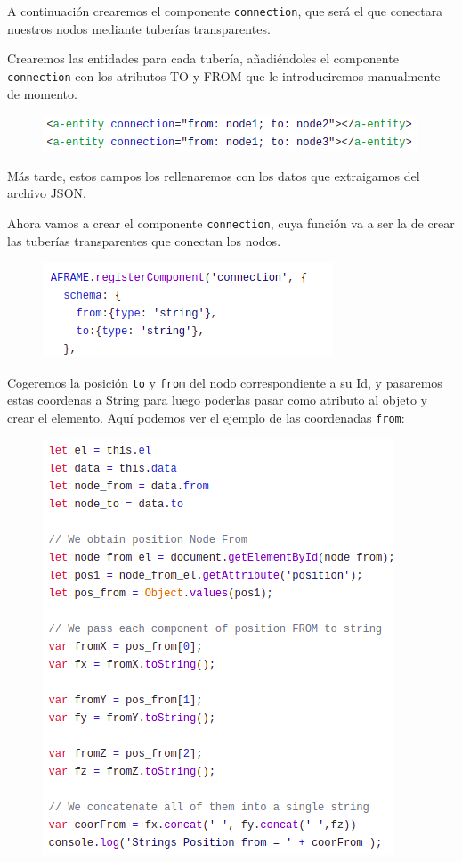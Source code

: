 \documentclass[a4paper, 12pt]{book}
\begin{document}
A continuación crearemos el componente \texttt{connection}, que será el que conectara nuestros nodos mediante tuberías transparentes.

Crearemos las entidades para cada tubería, añadiéndoles el componente \texttt{connection} con los atributos TO y FROM que le introduciremos manualmente de momento.

\begin{figure}[h]
\centering
    \includegraphics[scale=0.7]{img/entidad_connect.png}
\end{figure}

Más tarde, estos campos los rellenaremos con los datos que extraigamos del archivo JSON.

Ahora vamos a crear el componente \texttt{connection}, cuya función va a ser la de crear las tuberías transparentes que conectan los nodos.

\begin{figure}[h]
\centering
    \includegraphics[scale=0.7]{img/comp_conn.png}
\end{figure}

Cogeremos la posición \texttt{to} y \texttt{from} del nodo correspondiente a su Id, y pasaremos estas coordenas a String para luego poderlas pasar como atributo al objeto y crear el elemento.
Aquí podemos ver el ejemplo de las coordenadas \texttt{from}:
\begin{figure}[h]
\centering
    \includegraphics[scale=0.6]{img/datos_from.png}
\end{figure}
\end{document}
